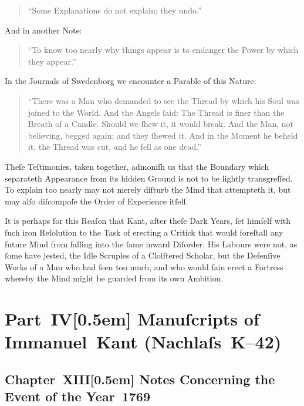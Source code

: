 \documentclass[12pt]{book}
\begin{document}
\begin{quote}
``Some Explanations do not explain; they undo.''
\end{quote}

And in another Note:

\begin{quote}
``To know too nearly why things appear is to endanger the Power by which they appear.''
\end{quote}

In the Journals of Swedenborg we encounter a Parable of this Nature:

\begin{quote}
``There was a Man who demanded to see the Thread by which his Soul was joined to the World. And the Angels ſaid: The Thread is finer than the Breath of a Candle. Should we ſhew it, it would break. And the Man, not believing, begged again; and they ſhewed it. And in the Moment he beheld it, the Thread was cut, and he fell as one dead.''
\end{quote}

Theſe Teſtimonies, taken together, admoniſh us that the Boundary which separateth Appearance from its hidden Ground is not to be lightly transgreſſed. To explain too nearly may not merely diſturb the Mind that attempteth it, but may alſo diſcompoſe the Order of Experience itſelf.

It is perhaps for this Reaſon that Kant, after theſe Dark Years, ſet himſelf with ſuch iron Reſolution to the Task of erecting a Critick that would foreſtall any future Mind from falling into the ſame inward Diſorder. His Labours were not, as ſome have jested, the Idle Scruples of a Cloiſtered Scholar, but the Defenſive Works of a Man who had ſeen too much, and who would fain erect a Fortress whereby the Mind might be guarded from its own Ambition.

\newpage

\part*{Part~IV[0.5em]
Manuſcripts of Immanuel~Kant (Nachlaſs~K–42)}



\chapter*{Chapter~XIII[0.5em]
Notes Concerning the Event of the Year~1769}
\end{document}
